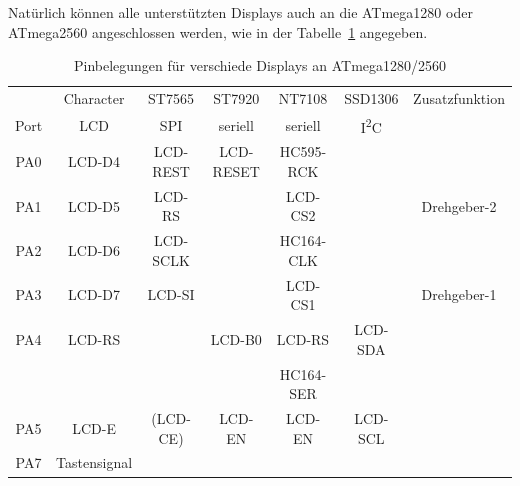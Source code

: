 Natürlich können alle unterstützten Displays auch an die ATmega1280 oder ATmega2560 angeschlossen
werden, wie in der Tabelle~\ref{tab:display-1280} angegeben.

\begin{table}[H]
  \begin{center}
    \begin{tabular}{| c || c | c | c | c | c | c |}
    \hline
           & Character     &  ST7565     & ST7920       & NT7108       & SSD1306     & Zusatzfunktion \\
      Port & LCD           &    SPI      & seriell      & seriell      &    I\textsuperscript{2}C      & \\
    \hline
    \hline
    PA0    &  LCD-D4       &   LCD-REST  &  LCD-RESET   & HC595-RCK       &             & \\
    \hline
    PA1    &  LCD-D5       &   LCD-RS    &              & LCD-CS2        &             & Drehgeber-2 \\
    \hline
    PA2    &  LCD-D6       &   LCD-SCLK  &              & HC164-CLK      &             & \\
    \hline
    PA3    &  LCD-D7       &   LCD-SI    &              & LCD-CS1        &             & Drehgeber-1 \\
    \hline
    PA4    &  LCD-RS       &             &   LCD-B0     & LCD-RS         &   LCD-SDA   & \\
           &               &             &              & HC164-SER      &             & \\
    \hline
    PA5    &  LCD-E        &  (LCD-CE)   &   LCD-EN     & LCD-EN         &   LCD-SCL  & \\
    \hline
    PA7    &  Tastensignal &             &              &                &             & \\
    \hline
    \end{tabular}
  \end{center}
  \caption{Pinbelegungen für verschiede Displays an ATmega1280/2560}
\label{tab:display-1280}
\end{table}

